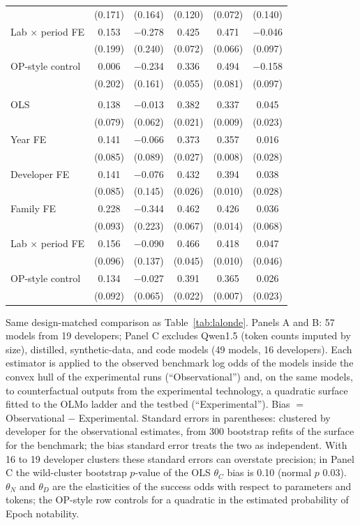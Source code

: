 \begin{table}[tp]
\begin{tabular}{@{}lccccc@{}}
 & (0.171) & (0.164) & (0.120) & (0.072) & (0.140) \\
Lab $\times$ period FE & 0.153 & $-$0.278 & 0.425 & 0.471 & $-$0.046 \\
 & (0.199) & (0.240) & (0.072) & (0.066) & (0.097) \\
OP-style control & 0.006 & $-$0.234 & 0.336 & 0.494 & $-$0.158 \\
 & (0.202) & (0.161) & (0.055) & (0.081) & (0.097) \\
\addlinespace
\multicolumn{6}{@{}l}{\textit{Panel C. HellaSwag log odds, restricted sample (49 models)}} \\
OLS & 0.138 & $-$0.013 & 0.382 & 0.337 & 0.045 \\
 & (0.079) & (0.062) & (0.021) & (0.009) & (0.023) \\
Year FE & 0.141 & $-$0.066 & 0.373 & 0.357 & 0.016 \\
 & (0.085) & (0.089) & (0.027) & (0.008) & (0.028) \\
Developer FE & 0.141 & $-$0.076 & 0.432 & 0.394 & 0.038 \\
 & (0.085) & (0.145) & (0.026) & (0.010) & (0.028) \\
Family FE & 0.228 & $-$0.344 & 0.462 & 0.426 & 0.036 \\
 & (0.093) & (0.223) & (0.067) & (0.014) & (0.068) \\
Lab $\times$ period FE & 0.156 & $-$0.090 & 0.466 & 0.418 & 0.047 \\
 & (0.096) & (0.137) & (0.045) & (0.010) & (0.046) \\
OP-style control & 0.134 & $-$0.027 & 0.391 & 0.365 & 0.026 \\
 & (0.092) & (0.065) & (0.022) & (0.007) & (0.023) \\
\bottomrule
\end{tabular}
\par\smallskip
\begin{tablenotes}Same design-matched comparison as Table~\ref{tab:lalonde}. Panels A and B: 57 models from 19 developers; Panel C excludes Qwen1.5 (token counts imputed by size), distilled, synthetic-data, and code models (49 models, 16 developers). Each estimator is applied to the observed benchmark log odds of the models inside the convex hull of the experimental runs (``Observational'') and, on the same models, to counterfactual outputs from the experimental technology, a quadratic surface fitted to the OLMo ladder and the \citet{gadre2024language} testbed (``Experimental''). Bias $=$ Observational $-$ Experimental. Standard errors in parentheses: clustered by developer for the observational estimates, from 300 bootstrap refits of the surface for the benchmark; the bias standard error treats the two as independent. With 16 to 19 developer clusters these standard errors can overstate precision; in Panel C the wild-cluster bootstrap $p$-value of the OLS $\theta_C$ bias is 0.10 (normal $p$ 0.03). $\theta_N$ and $\theta_D$ are the elasticities of the success odds with respect to parameters and tokens; the OP-style row controls for a quadratic in the estimated probability of Epoch notability.\end{tablenotes}

\end{table}

